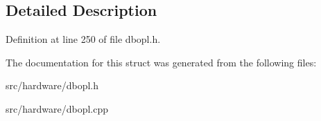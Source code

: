 \subsection{Detailed Description}


Definition at line 250 of file dbopl.\-h.



The documentation for this struct was generated from the following files\-:\begin{DoxyCompactItemize}
\item 
src/hardware/dbopl.\-h\item 
src/hardware/dbopl.\-cpp\end{DoxyCompactItemize}
